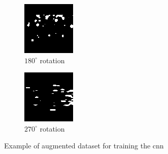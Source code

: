 \documentclass[10pt,twocolumn,letterpaper]{article}
\begin{document}
\begin{figure}
  \begin{subfigure}{0.33\linewidth}
    \includegraphics[width=\linewidth]{img_aug_rot_180}
    \caption{$180^\circ$ rotation}
    \label{fig:img_aug_180}
  \end{subfigure}
  \qquad
  \begin{subfigure}{0.33\linewidth}
    \includegraphics[width=\linewidth]{img_aug_rot_270}
    \caption{$270^\circ$ rotation}
    \label{fig:img_aug_270}
  \end{subfigure}
  \caption{Example of augmented dataset for training the \acrlong{cnn}}
  \label{fig:cnn_aug_imgs}
\end{figure}
\end{document}
